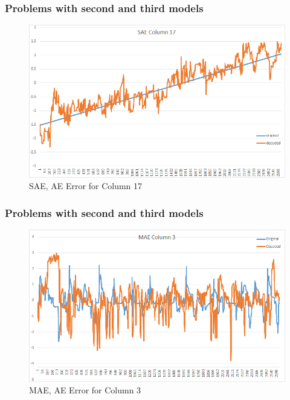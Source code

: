 \documentclass{beamer}
\begin{document}
\begin{frame}
\frametitle{Problems with second and third models}
\begin{figure}[t!]
    \centering
    \includegraphics[width=\textwidth]{../paper/pictures/result_pictures/SAE_Column_17.png}
    \caption{SAE, AE Error for Column 17}
    \label{fig:sae_error_c17}
\end{figure}
\end{frame}

\begin{frame}
\frametitle{Problems with second and third models}
\begin{figure}[t!]
    \centering
    \includegraphics[width=\textwidth]{../paper/pictures/result_pictures/MAE_Column_3.png}
    \caption{MAE, AE Error for Column 3}
    \label{fig:mae_error_c3}
\end{figure}
\end{frame}
\end{document}
